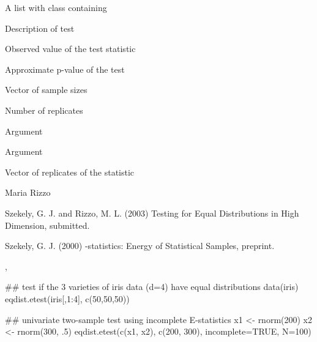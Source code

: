 \begin{Value}
A list with class  containing
\begin{ldescription}
\item[\code{method}] Description of test
\item[\code{statistic}] Observed value of the test statistic
\item[\code{p.value}] Approximate p-value of the test
\item[\code{sizes}] Vector of sample sizes
\item[\code{R}] Number of replicates
\item[\code{incomplete}] Argument 
\item[\code{N}] Argument 
\item[\code{replicates}] Vector of replicates of the statistic
\end{ldescription}
\end{Value}
\begin{Author}\relax
Maria Rizzo 
\end{Author}
\begin{References}\relax
Szekely, G. J. and Rizzo, M. L. (2003) Testing for Equal
Distributions in High Dimension, submitted.

Szekely, G. J. (2000) -statistics: Energy of 
Statistical Samples, preprint.\end{References}
\begin{SeeAlso}\relax
{},
\end{SeeAlso}
\begin{Examples}
\begin{ExampleCode}
 ## test if the 3 varieties of iris data (d=4) have equal distributions
 data(iris)
 eqdist.etest(iris[,1:4], c(50,50,50))
 
 ## univariate two-sample test using incomplete E-statistics
 x1 <- rnorm(200)
 x2 <- rnorm(300, .5)
 eqdist.etest(c(x1, x2), c(200, 300), incomplete=TRUE, N=100)
\end{ExampleCode}
\end{Examples}


